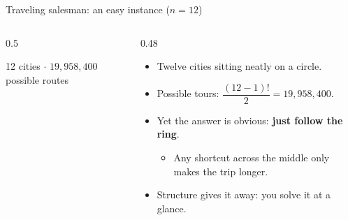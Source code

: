 \ifdefined\PRESENTATION\else\PassOptionsToClass{handout}{beamer}\fi\documentclass[aspectratio=169, lualatex]{beamer}
\begin{document}
\begin{frame}{Traveling salesman: an easy instance ($n = 12$)}
	\begin{columns}[c]
		\begin{column}{0.5\textwidth}
			\begin{center}
			\end{center}
			\begin{center}
				\small 12 cities $\cdot$ $19{,}958{,}400$ possible routes
			\end{center}
		\end{column}
		\begin{column}{0.48\textwidth}
			\begin{itemize}[<+->]
				\item Twelve cities sitting neatly on a circle.
				\item Possible tours: $\dfrac{(12-1)!}{2} = 19{,}958{,}400$.
				\item Yet the answer is obvious: \textbf{just follow the ring}.
				      \begin{itemize}
					      \item Any shortcut across the middle only makes the trip longer.
				      \end{itemize}
				\item Structure gives it away: you solve it at a glance.
			\end{itemize}
		\end{column}
	\end{columns}
\end{frame}
\end{document}
